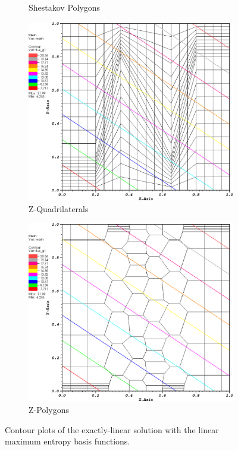 \begin{figure}
{\begin{subfigure}[b]{0.45\textwidth}
		\caption{Shestakov Polygons}
	\end{subfigure}
}
\vspace{3mm}
{
	\begin{subfigure}[b]{0.45\textwidth}
		\centering
		\label{subfig::z_quad_me_k1_lin_sol}
		\includegraphics[width=\textwidth]{figures/sec_BF/z_quad_MAXENT_k1.eps}
		\caption{Z-Quadrilaterals}
	\end{subfigure}
	\hfill
	\begin{subfigure}[b]{0.45\textwidth}
		\centering
		\label{subfig::z_poly_me_k1_lin_sol}
		\includegraphics[width=\textwidth]{figures/sec_BF/z_poly_MAXENT_k1.eps}
		\caption{Z-Polygons}
	\end{subfigure}
}
\caption{Contour plots of the exactly-linear solution with the linear maximum entropy basis functions.}
\label{fig::BF_Results_Linear_me1_sol}
\end{figure}


